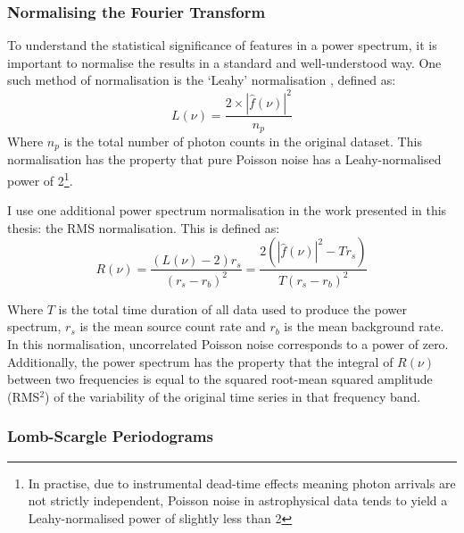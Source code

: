 \subsubsection{Normalising the Fourier Transform}

\par To understand the statistical significance of features in a power spectrum, it is important to normalise the results in a standard and well-understood way.  One such method of normalisation is the `Leahy' normalisation \citep{Leahy_Norm}, defined as:
\begin{equation}
L(\nu)=\frac{2\times|\hat{f}(\nu)|^2}{n_{p}}
\end{equation}
Where $n_p$ is the total number of photon counts in the original dataset.  This normalisation has the property that pure Poisson noise has a Leahy-normalised power of 2\footnote{In practise, due to instrumental dead-time effects meaning photon arrivals are not strictly independent, Poisson noise in astrophysical data tends to yield a Leahy-normalised power of slightly less than 2}.
\par I use one additional power spectrum normalisation in the work presented in this thesis: the RMS normalisation.  This is defined as:
\begin{equation}
R(\nu)=\frac{(L(\nu)-2)r_s}{(r_s-r_b)^2}=\frac{2\left(|\hat{f}(\nu)|^2-Tr_s\right)}{T(r_s-r_b)^2}
\end{equation}
\par Where $T$ is the total time duration of all data used to produce the power spectrum, $r_s$ is the mean source count rate and $r_b$ is the mean background rate.  In this normalisation, uncorrelated Poisson noise corresponds to a power of zero.  Additionally, the power spectrum has the property that the integral of $R(\nu)$ between two frequencies is equal to the squared root-mean squared amplitude (RMS$^2$) of the variability of the original time series in that frequency band.

\subsubsection{Lomb-Scargle Periodograms}

